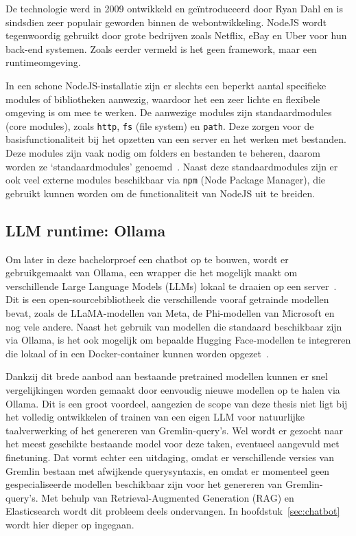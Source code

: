De technologie werd in 2009 ontwikkeld en geïntroduceerd door Ryan Dahl en is sindsdien zeer populair geworden binnen de webontwikkeling. 
NodeJS wordt tegenwoordig gebruikt door grote bedrijven zoals Netflix, eBay en Uber voor hun back-end systemen.
Zoals eerder vermeld is het geen framework, maar een runtimeomgeving.

In een schone NodeJS-installatie zijn er slechts een beperkt aantal specifieke modules of bibliotheken aanwezig, waardoor het een zeer lichte en flexibele omgeving is om mee te werken.
De aanwezige modules zijn standaardmodules (core modules), zoals \texttt{http}, \texttt{fs} (file system) en \texttt{path}. 
Deze zorgen voor de basisfunctionaliteit bij het opzetten van een server en het werken met bestanden.
Deze modules zijn vaak nodig om folders en bestanden te beheren, daarom worden ze `standaardmodules' genoemd~\autocite{Kumar2023}.
Naast deze standaardmodules zijn er ook veel externe modules beschikbaar via \texttt{npm} (Node Package Manager), die gebruikt kunnen worden om de functionaliteit van NodeJS uit te breiden.

\subsection{LLM runtime: Ollama}
Om later in deze bachelorproef een chatbot op te bouwen, wordt er gebruikgemaakt van Ollama, een wrapper die het mogelijk maakt om verschillende Large Language Models (LLMs) lokaal te draaien op een server~\autocite{Manandhar2025}. 
Dit is een open-sourcebibliotheek die verschillende vooraf getrainde modellen bevat, zoals de LLaMA-modellen van Meta, de Phi-modellen van Microsoft en nog vele andere.
Naast het gebruik van modellen die standaard beschikbaar zijn via Ollama, is het ook mogelijk om bepaalde Hugging Face-modellen te integreren die lokaal of in een Docker-container kunnen worden opgezet~\autocite{HuggingFace2024}.

Dankzij dit brede aanbod aan bestaande pretrained modellen kunnen er snel vergelijkingen worden gemaakt door eenvoudig nieuwe modellen op te halen via Ollama.
Dit is een groot voordeel, aangezien de scope van deze thesis niet ligt bij het volledig ontwikkelen of trainen van een eigen LLM voor natuurlijke taalverwerking of het genereren van Gremlin-query's.
Wel wordt er gezocht naar het meest geschikte bestaande model voor deze taken, eventueel aangevuld met finetuning. 
Dat vormt echter een uitdaging, omdat er verschillende versies van Gremlin bestaan met afwijkende querysyntaxis, en omdat er momenteel geen gespecialiseerde modellen beschikbaar zijn voor het genereren van Gremlin-query's.
Met behulp van Retrieval-Augmented Generation (RAG) en Elasticsearch wordt dit probleem deels ondervangen. In hoofdstuk~\ref{sec:chatbot} wordt hier dieper op ingegaan.


